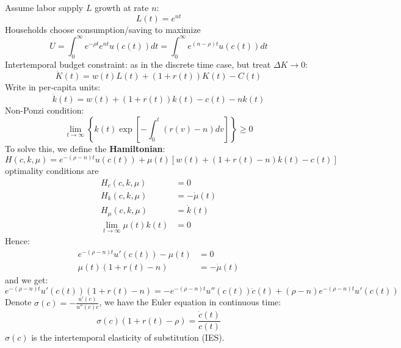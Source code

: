 Assume labor supply $L$ growth at rate $n$:
\[ L(t) = e^{nt} \]
Households choose consumption/saving to maximize
\[ U = \int_0^{\infty} e^{-\rho t}e^{nt}u(c(t))dt = \int_0^{\infty} e^{(n-\rho)t}u(c(t))dt \]
Intertemporal budget constraint: as in the discrete time case, but treat $\Delta K \to 0$:
\[ \dot{K}(t) = w(t)L(t) + (1 + r(t))K(t) - C(t) \]
Write in per-capita units:
\[ \dot{k}(t) = w(t) + (1 + r(t))k(t) - c(t) - nk(t) \]
Non-Ponzi condition:
\[ \lim_{t \to \infty} \left\{k(t)\exp\left[-\int_0^t(r(v) - n)dv\right]\right\} \geq 0 \]
To solve this, we define the \textbf{Hamiltonian}:
\[ H(c, k, \mu) = e^{-(\rho - n)t}u(c(t)) + \mu(t)[w(t) + (1 + r(t) - n)k(t) - c(t)] \]
optimality conditions are
\begin{align*}
    H_c(c, k, \mu) &= 0 \\
    H_k(c, k, \mu) &= -\dot{\mu}(t) \\
    H_{\mu}(c, k, \mu) &= \dot{k}(t) \\
    \lim_{t \to \infty} \mu(t)k(t) &= 0
\end{align*}
Hence:
\begin{align*}
    e^{-(\rho - n)t}u'(c(t)) - \mu(t) &= 0 \\
    \mu(t)(1 + r(t) - n) &= -\dot{\mu}(t)
\end{align*}
and we get:
\[ e^{-(\rho - n)t}u'(c(t))(1 + r(t) - n) = -e^{-(\rho - n)t}u''(c(t))\dot{c}(t) + (\rho - n)e^{-(\rho - n)t}u'(c(t)) \]
Denote $\sigma(c) = -\frac{u'(c)}{u''(c)c}$, we have the Euler equation in continuous time:
\[ \sigma(c)(1 + r(t) - \rho) = \frac{\dot{c}(t)}{c(t)} \]
$\sigma(c)$ is the intertemporal elasticity of substitution (IES).